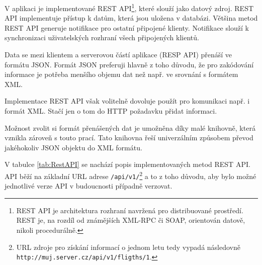\documentclass[ing,male,java,dept460,twoside]{diploma}						%
\begin{document}
V aplikaci je implementované REST API\footnote{REST API je architektura rozhraní navržená pro distribuované prostředí. REST je, na rozdíl od známějších XML-RPC či SOAP, orientován datově, nikoli procedurálně.}, které slouží jako datový zdroj. REST API implementuje přístup k datům, která jsou uložena v databázi. Většina metod REST API generuje notifikace pro ostatní připojené klienty. Notifikace slouží k synchronizaci uživatelských rozhraní všech připojených klientů.

Data se mezi klientem a serverovou částí aplikace (RESP API) přenáší ve formátu JSON. Formát JSON preferuji hlavně z toho důvodu, že pro zakódování informace je potřeba menšího objemu dat než např. ve srovnání s formátem XML.

Implementace REST API však volitelně dovoluje použít pro komunikaci např. i formát XML. Stačí jen o tom do HTTP požadavku přidat informaci.

Možnost zvolit si formát přenášených dat je umožněna díky malé knihovně, která vznikla zároveň s touto prací. Tato knihovna řeší univerzálním způsobem převod jakéhokoliv JSON objektu do XML formátu.

V tabulce \ref{tab:RestAPI} se nachází popis implementovaných metod REST API. API běží na základní URL adrese \texttt{/api/v1/}\footnote{URL zdroje pro získání informací o jednom letu tedy vypadá následovně \texttt{http://muj.server.cz/api/v1/fligths/1}.} a to z toho důvodu, aby bylo možné jednotlivé verze API v budoucnosti případně verzovat.
\end{document}
